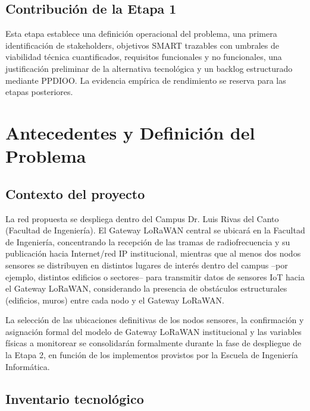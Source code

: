 \documentclass[12pt,oneside,openany,spanish,oldfontcommands]{memoir}
\begin{document}
\section{Contribución de la Etapa 1}

Esta etapa establece una definición operacional del problema, una primera identificación
de stakeholders, objetivos SMART trazables con umbrales de viabilidad técnica cuantificados,
requisitos funcionales y no funcionales, una justificación preliminar de la alternativa
tecnológica y un backlog estructurado mediante PPDIOO. La evidencia empírica de rendimiento
se reserva para las etapas posteriores.

\chapter{Antecedentes y Definición del Problema}

\section{Contexto del proyecto}

La red propuesta se despliega dentro del Campus Dr. Luis Rivas del Canto (Facultad de
Ingeniería). El Gateway LoRaWAN central se ubicará en la Facultad de Ingeniería,
concentrando la recepción de las tramas de radiofrecuencia y su publicación hacia
Internet/red IP institucional, mientras que al menos dos nodos sensores se distribuyen
en distintos lugares de interés dentro del campus --por ejemplo, distintos edificios o
sectores-- para transmitir datos de sensores IoT hacia el Gateway LoRaWAN, considerando
la presencia de obstáculos estructurales (edificios, muros) entre cada nodo y el Gateway
LoRaWAN.

La selección de las ubicaciones definitivas de los nodos sensores, la confirmación y
asignación formal del modelo de Gateway LoRaWAN institucional y las variables físicas
a monitorear se consolidarán formalmente durante la fase de despliegue de la Etapa 2,
en función de los implementos provistos por la Escuela de Ingeniería Informática.

\section{Inventario tecnológico}
\end{document}
